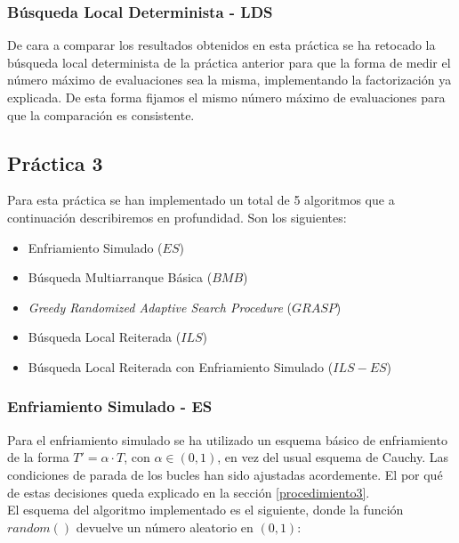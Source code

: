 \documentclass[11pt,a4paper]{article}
\begin{document}
	\subsubsection{ Búsqueda Local Determinista - LDS }
	
	De cara a comparar los resultados obtenidos en esta práctica se ha retocado la búsqueda local determinista de la práctica anterior para que la forma de medir el número máximo de evaluaciones sea la misma, implementando la factorización ya explicada. De esta forma fijamos el mismo número máximo de evaluaciones para que la comparación es consistente. 
	
	\subsection{Práctica 3} \label{sec43}
	
	Para esta práctica se han implementado un total de 5 algoritmos que a continuación describiremos en profundidad. Son los siguientes:
	\begin{itemize}
		\item Enfriamiento Simulado ($ES$)
		\item Búsqueda Multiarranque Básica ($BMB$)
		\item \emph{Greedy Randomized Adaptive Search Procedure} ($GRASP$)
		\item Búsqueda Local Reiterada ($ILS$)
		\item Búsqueda Local Reiterada con Enfriamiento Simulado  ($ILS-ES$)
	\end{itemize}

	
	\subsubsection{ Enfriamiento Simulado - ES }
	
	Para el enfriamiento simulado se ha utilizado un esquema básico de enfriamiento de la forma $T' = \alpha \cdot T$, con $\alpha \in (0,1)$, en vez del usual esquema de Cauchy. Las condiciones de parada de los bucles han sido ajustadas acordemente. El por qué de estas decisiones queda explicado en la sección \ref{procedimiento3}. \\
	
	El esquema del algoritmo implementado es el siguiente, donde la función $random()$ devuelve un número aleatorio en $(0,1)$: \\
	
\end{document}

